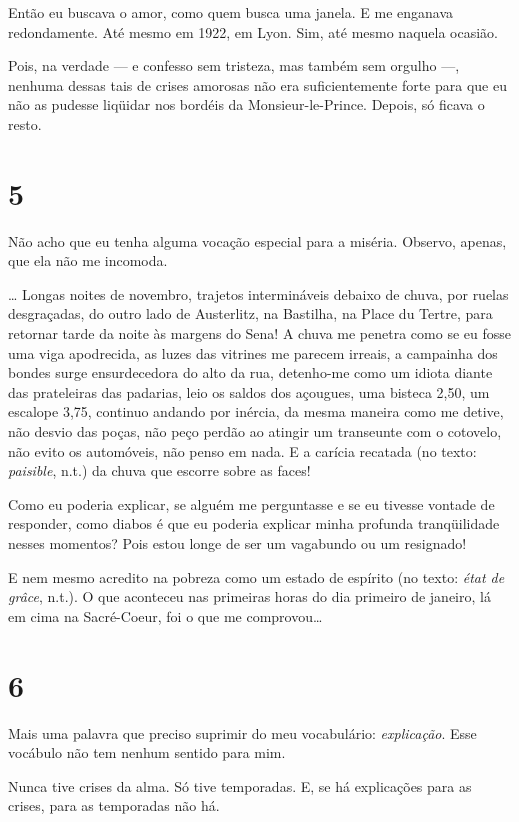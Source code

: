 Então eu buscava o amor, como quem busca uma janela. E me enganava
redondamente. Até mesmo em 1922, em Lyon. Sim, até mesmo naquela
ocasião.

Pois, na verdade --- e confesso sem tristeza, mas também sem orgulho ---,
nenhuma dessas tais de crises amorosas não era suficientemente forte
para que eu não as pudesse liqüidar nos bordéis da Monsieur-le-Prince.
Depois, só ficava o resto.

\section{5}

Não acho que eu tenha alguma vocação especial para a miséria. Observo,
apenas, que ela não me incomoda.

\ldots{} Longas noites de novembro, trajetos intermináveis debaixo de
chuva, por ruelas desgraçadas, do outro lado de Austerlitz, na Bastilha,
na Place du Tertre, para retornar tarde da noite às margens do Sena! A
chuva me penetra como se eu fosse uma viga apodrecida, as luzes das
vitrines me parecem irreais, a campainha dos bondes surge ensurdecedora
do alto da rua, detenho-me como um idiota diante das prateleiras das
padarias, leio os saldos dos açougues, uma bisteca 2,50, um escalope
3,75, continuo andando por inércia, da mesma maneira como me detive, não
desvio das poças, não peço perdão ao atingir um transeunte com o
cotovelo, não evito os automóveis, não penso em nada. E a carícia
recatada (no texto: \emph{paisible}, n.t.) da chuva que escorre sobre as
faces!

Como eu poderia explicar, se alguém me perguntasse e se eu tivesse
vontade de responder, como diabos é que eu poderia explicar minha
profunda tranqüilidade nesses momentos? Pois estou longe de ser um
vagabundo ou um resignado!

E nem mesmo acredito na pobreza como um estado de espírito (no texto:
\emph{état de grâce}, n.t.). O que aconteceu nas primeiras horas do dia
primeiro de janeiro, lá em cima na Sacré-Coeur, foi o que me
comprovou\ldots{}

\section{6}

Mais uma palavra que preciso suprimir do meu vocabulário:
\emph{explicação}. Esse vocábulo não tem nenhum sentido para mim.

Nunca tive crises da alma. Só tive temporadas. E, se há explicações para
as crises, para as temporadas não há.

